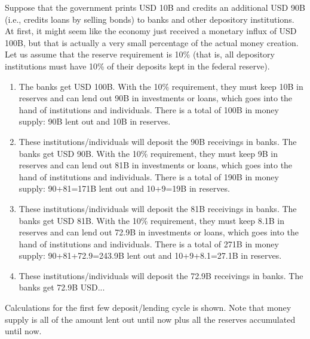 \documentclass{article}
\begin{document}
    \begin{example}
      Suppose that the government prints USD 10B and credits an additional USD 90B (i.e., credits loans by selling bonds) to banks and other depository institutions. At first, it might seem like the economy just received a monetary influx of USD 100B, but that is actually a very small percentage of the actual money creation. Let us assume that the reserve requirement is 10\% (that is, all depository institutions must have 10\% of their deposits kept in the federal reserve).

      \begin{enumerate}
        \item The banks get USD 100B. With the 10\% requirement, they must keep 10B in reserves and can lend out 90B in investments or loans, which goes into the hand of institutions and individuals. There is a total of 100B in money supply: 90B lent out and 10B in reserves.
        \item These institutions/individuals will deposit the 90B receivings in banks. The banks get USD 90B. With the 10\% requirement, they must keep 9B in reserves and can lend out 81B in investments or loans, which goes into the hand of institutions and individuals. There is a total of 190B in money supply: 90+81=171B lent out and 10+9=19B in reserves.
        \item These institutions/individuals will deposit the 81B receivings in banks. The banks get USD 81B. With the 10\% requirement, they must keep 8.1B in reserves and can lend out 72.9B in investments or loans, which goes into the hand of institutions and individuals. There is a total of 271B in money supply: 90+81+72.9=243.9B lent out and 10+9+8.1=27.1B in reserves.
        \item These institutions/individuals will deposit the 72.9B receivings in banks. The banks get 72.9B USD...
      \end{enumerate}

      Calculations for the first few deposit/lending cycle is shown. Note that money supply is all of the amount lent out until now plus all the reserves accumulated until now.


\end{example}
\end{document}
